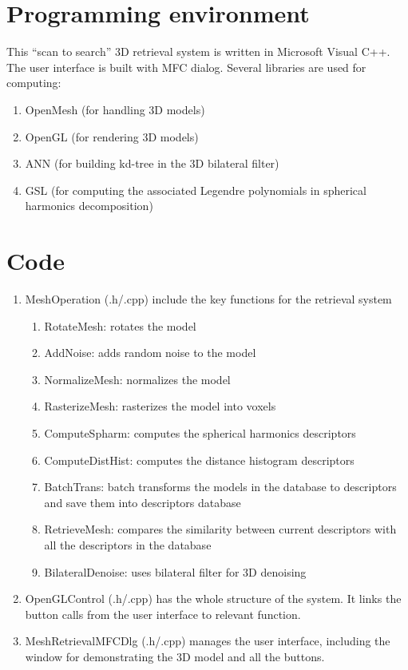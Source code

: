 \section{Programming environment}

This ``scan to search'' 3D retrieval system is written in Microsoft Visual C++. The user interface is built with MFC dialog. Several libraries are used for computing: 

\begin{enumerate}[1.]
\item OpenMesh (for handling 3D models)
\item OpenGL (for rendering 3D models)
\item ANN (for building kd-tree in the 3D bilateral filter)
\item GSL (for computing the associated Legendre polynomials in spherical harmonics decomposition)
\end{enumerate}

\section{Code}


\begin{enumerate}[1.]
\item MeshOperation (.h/.cpp) include the key functions for the retrieval system
    \begin{enumerate}[(1)]
    \item RotateMesh: rotates the model
    \item AddNoise: adds random noise to the model
    \item NormalizeMesh: normalizes the model
    \item RasterizeMesh: rasterizes the model into voxels 
    \item ComputeSpharm: computes the spherical harmonics descriptors
    \item ComputeDistHist: computes the distance histogram descriptors
    \item BatchTrans: batch transforms the models in the database to descriptors and save them into descriptors database
    \item RetrieveMesh: compares the similarity between current descriptors with all the descriptors in the database
    \item BilateralDenoise: uses bilateral filter for 3D denoising 
    \end{enumerate}
\item OpenGLControl (.h/.cpp) has the whole structure of the system. It links the button calls from the user interface to relevant function. 
\item MeshRetrievalMFCDlg (.h/.cpp) manages the user interface, including the window for demonstrating the 3D model and all the buttons. 
\end{enumerate}

